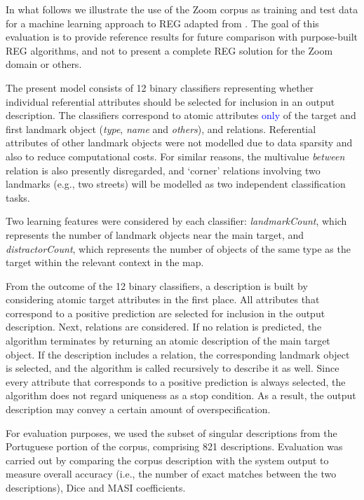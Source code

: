 \documentclass[11pt]{article}
\begin{document}
In what follows we illustrate the use of the Zoom corpus as training and test data for a machine learning approach to REG adapted from \cite{thiago-svm}. The  goal of this evaluation is to provide reference results for future comparison with purpose-built REG algorithms, and not to present a complete REG solution for the Zoom domain or others.

The present model consists of 12 binary classifiers representing whether individual referential attributes should be selected for inclusion in an output description. The classifiers correspond to atomic attributes \textcolor{blue}{only} of the target and first landmark object ({\em type}, {\em name} and {\em others}), and relations. Referential attributes of other landmark objects were not modelled due to data sparsity and also to reduce computational costs. For similar reasons, the multivalue {\em between} relation is also presently disregarded, and `corner' relations involving two landmarks (e.g., two streets) will be modelled as two independent classification tasks.

Two learning features were considered by each classifier: {\em landmarkCount}, which represents the number of landmark objects near the main target, and {\em distractorCount}, which represents the number of objects of the same type as the target within the relevant context in the map.

From the outcome of the 12 binary classifiers, a description is built by considering atomic target attributes in the first place. All attributes that correspond to a positive prediction are selected for inclusion in the output description. Next, relations are considered. If no relation is predicted, the algorithm terminates by returning an atomic description  of the main target object. If the description includes a relation, the corresponding landmark object is selected, and the algorithm is called recursively to describe it as well. Since every attribute that corresponds to a positive prediction is always selected, the algorithm does not regard uniqueness as a stop condition. As a result, the output description may convey a certain amount of overspecification.

For evaluation purposes, we used the subset of singular descriptions from the Portuguese portion of the corpus, comprising 821 descriptions. Evaluation was carried out by comparing the corpus description with the system output to measure overall accuracy (i.e., the number of exact matches between the two descriptions), Dice \cite{dice} and MASI \cite{masi} coefficients.%
\end{document}
